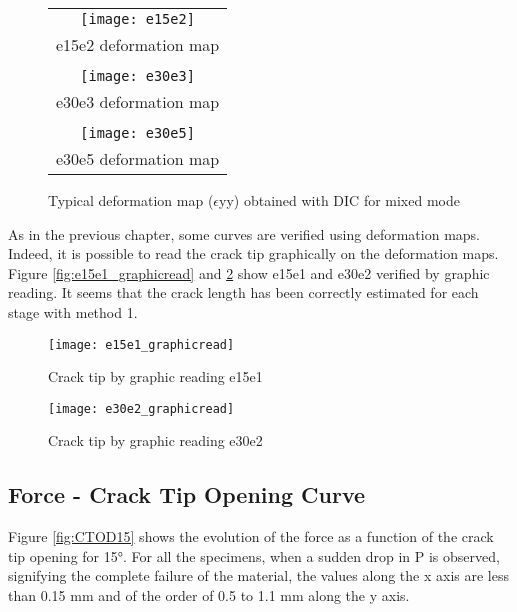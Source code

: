 \begin{figure}[htp]
	\centering
	\begin{tabular}{c}
		\texttt{[image: e15e2]} \\
		e15e2 deformation map \\
		\\
		\texttt{[image: e30e3]} \\
		e30e3 deformation map \\
		\\
		\texttt{[image: e30e5]} \\
		e30e5 deformation map \\
	\end{tabular}
	\caption{Typical deformation map ($\epsilon$yy) obtained with DIC for mixed mode}
	\label{fig:Strain_def_mixedmode}
\end{figure}

As in the previous chapter, some curves are verified using deformation maps. Indeed, it is possible to read the crack tip graphically  on the deformation maps. Figure \ref{fig:e15e1_graphicread} and \ref{fig:e30e2_graphicread} show e15e1 and e30e2 verified by graphic reading. It seems that the crack length has been correctly estimated for each stage with method 1.

\begin{figure}[htp]
	\begin{minipage}[c]{.46\linewidth}
		\centering
		\texttt{[image: e15e1\_graphicread]}
		\caption{Crack tip by graphic reading e15e1}
		\label{fig:e15e1_graphicread}
	\end{minipage}
	\hfill%
	\begin{minipage}[c]{.46\linewidth}
		\centering
		\texttt{[image: e30e2\_graphicread]}
		\caption{Crack tip by graphic reading e30e2 }
		\label{fig:e30e2_graphicread}
	\end{minipage}
\end{figure}

\subsection{Force - Crack Tip Opening Curve}

Figure \ref{fig:CTOD15} shows the evolution of the force as a function of the crack tip opening for 15°. For all the specimens, when a sudden drop in P is observed, signifying the complete failure of the material, the values along the x axis are less than 0.15 mm and of the order of 0.5 to 1.1 mm along the y axis.

